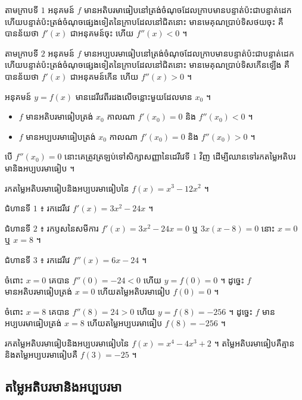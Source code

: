 តាមក្រាបទី $1$ អនុគមន៍ $f$ មានអតិបរមាធៀបនៅត្រង់ចំណុចដែលក្រាបមានបន្ទាត់ប៉ះជាបន្ទាត់ដេក ហើយបន្ទាត់ប៉ះត្រង់ចំណុចផ្សេងទៀតនៃក្រាបដែលនៅជិតនោះ មានមេគុណប្រាប់ទិសថយចុះ គឺបានន័យថា $f'(x)$ ជាអនុគមន៍ចុះ ហើយ $f''(x) < 0$ ។

តាមក្រាបទី $2$ អនុគមន៍ $f$ មានអប្បបរមាធៀបនៅត្រង់ចំណុចដែលក្រាបមានបន្ទាត់ប៉ះជាបន្ទាត់ដេក ហើយបន្ទាត់ប៉ះត្រង់ចំណុចផ្សេងទៀតនៃក្រាបដែលនៅជិតនោះ មានមេគុណប្រាប់ទិសកើនឡើង គឺបានន័យថា $f'(x)$ ជាអនុគមន៍កើន ហើយ $f''(x) > 0$ ។

\begin{formulaBox}[ជាទូទៅ]
អនុគមន៍ $y = f(x)$ មានដេរីវេពីរដងលើចន្លោះមួយដែលមាន $x_0$ ។
\begin{itemize}
  \item $f$ មានអតិបរមាធៀបត្រង់ $x_0$ កាលណា $f'(x_0) = 0$ និង $f''(x_0) < 0$ ។
  \item $f$ មានអប្បបរមាធៀបត្រង់ $x_0$ កាលណា $f'(x_0) = 0$ និង $f''(x_0) > 0$ ។
\end{itemize}
\end{formulaBox}

\begin{note}[សម្គាល់]
បើ $f''(x_0) = 0$ នោះគេត្រូវត្រឡប់ទៅសិក្សាសញ្ញានៃដេរីវេទី $1$ វិញ ដើម្បីឈានទៅរកតម្លៃអតិបរមានិងអប្បបរមាធៀប ។
\end{note}

\begin{example}[លំហាត់គំរូ]
រកតម្លៃអតិបរមាធៀបនិងអប្បបរមាធៀបនៃ $f(x) = x^3 - 12x^2$ ។
\end{example}
\ans
ជំហានទី $1$ ៖ រកដេរីវេ $f'(x) = 3x^2 - 24x$ ។

ជំហានទី $2$ ៖ រកឫសនៃសមីការ $f'(x) = 3x^2 - 24x = 0$ ឬ $3x(x - 8) = 0$ នោះ $x = 0$ ឬ $x = 8$ ។

ជំហានទី $3$ ៖ រកដេរីវេ $f''(x) = 6x - 24$ ។

ចំពោះ $x = 0$ គេបាន $f''(0) = -24 < 0$ ហើយ $y = f(0) = 0$ ។ ដូច្នេះ $f$ មានអតិបរមាធៀបត្រង់ $x = 0$ ហើយតម្លៃអតិបរមាធៀប $f(0) = 0$ ។

ចំពោះ $x = 8$ គេបាន $f''(8) = 24 > 0$ ហើយ $y = f(8) = -256$ ។ ដូច្នេះ $f$ មានអប្បបរមាធៀបត្រង់ $x = 8$ ហើយតម្លៃអប្បបរមាធៀប $f(8) = -256$ ។

\begin{pro}
រកតម្លៃអតិបរមាធៀបនិងអប្បបរមាធៀបនៃ $f(x) = x^4 - 4x^3 + 2$ ។
\ans
តម្លៃអតិបរមាធៀបគឺគ្មាន និងតម្លៃអប្បបរមាធៀបគឺ $f(3) = -25$ ។
\end{pro}

\subsection{តម្លៃអតិបរមានិងអប្បបរមា}


